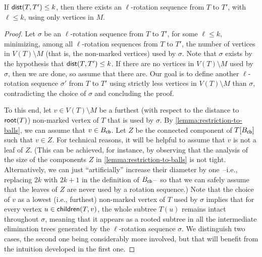\documentclass[a4paper,UKenglish,cleveref, autoref, thm-restate]{lipics-v2021}
\newcommand{\child}{{\sf children}\xspace}
\renewcommand{\root}{{\sf root}\xspace}
\newcommand{\dist}{{\sf dist}\xspace}
\newcommand{\Bcb}{B_{\sf cb}\xspace}
\begin{document}
\begin{lemma}\label{lem:main}
If $\dist(T,T')\leq k$, then there exists an $\ell$-rotation sequence from $T$ to $T'$, with $\ell \leq k$, using only vertices in $M$.
\end{lemma}
\begin{proof}
Let $\sigma$ be an $\ell$-rotation sequence from $T$ to $T'$, for some $\ell \leq k$, minimizing, among all $\ell$-rotation sequences from $T$ to $T'$, the number of vertices in $V(T) \setminus M$ (that is, the non-marked vertices) used by $\sigma$. Note that $\sigma$ exists by the hypothesis that $\dist(T,T')\leq k$. If there are no vertices in $V(T) \setminus M$ used by $\sigma$, then we are done, so assume that there are. Our goal is to define another $\ell$-rotation sequence $\sigma'$ from $T$ to $T'$ using strictly less vertices in $V(T) \setminus M$ than $\sigma$, contradicting the choice of $\sigma$ and concluding the proof.

To this end, let $v \in V(T) \setminus M$ be a furthest (with respect to the distance to $\root(T)$) non-marked vertex of $T$ that is used by $\sigma$. By \autoref{lemma:restriction-to-balls}, we can assume that $v \in \Bcb$. Let $Z$ be the connected component of $T[\Bcb]$ such that $v \in Z$. For technical reasons, it will be helpful to assume that $v$ is not a leaf of $Z$. (This can be achieved, for instance, by observing that the analysis of the size of the components $Z$ in \autoref{lemma:restriction-to-balls} is not tight. Alternatively, we can just ``artificially''  increase their diameter by one~--i.e., replacing $2k$ with $2k+1$ in the definition of $\Bcb$--~so that we can safely assume that the leaves of $Z$ are never used by a rotation sequence.) Note that the choice of $v$ as a lowest (i.e., furthest) non-marked vertex of $T$ used by $\sigma$ implies that for every vertex $u \in \child(T,v)$,  the whole subtree $T(u)$ remains intact throughout $\sigma$, meaning that it appears as a rooted subtree in all the intermediate elimination trees generated by the $\ell$-rotation sequence $\sigma$. We distinguish two cases, the second one being considerably more involved, but that will benefit from the intuition developed in the first one.

\bigskip
\noindent{}
\medskip


\end{proof}
\end{document}
